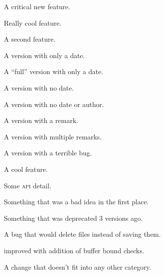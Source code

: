 \documentclass{article}
\begin{document}
\begin{changelog}[author=Rebecca Turner,
	sectioncmd=\subsection,
	title=Example changelog]
\begin{version}
\critical
	\item A critical new feature.
\added
	\item Really cool feature.
	\item A second feature.
\end{version}

\begin{version}[date=2019-01-23, short]
	A version with only a date.
\end{version}

\begin{version}[date=2019-01-23]
\added
	\item A ``full'' version with only a date.
\end{version}

\begin{version}[v=1.1.0, simple]
	\item A version with no date.
\end{version}

\begin{version}[v=1.1.0, author=]
\added
	\item A version with no date or author.
\end{version}

\begin{version}[v=1.0.3, remark=Remark, simple]
	\item A version with a remark.
\end{version}

\begin{version}[v=1.0.2, remarks={Remark 1, Remark 2}, simple]
	\item A version with multiple remarks.
\end{version}

\begin{version}[v=1.0.1, yanked, simple]
	\item A version with a terrible bug.
\end{version}

\begin{version}[v=1.0.0, date=2018-10-26]
\added
	\item A cool feature.
\changed
	\item Some \textsc{api} detail.
\deprecated
	\item Something that was a bad idea in the first place.
\removed
	\item Something that was deprecated 3 versions ago.
\fixed
	\item A bug that would delete files instead of saving them.
\security
	\item improved with addition of buffer bound checks.
\misc
	\item A change that doesn't fit into any other category.
\end{version}

\end{changelog}
\end{document}
